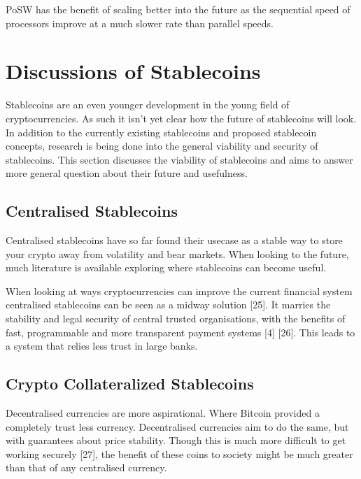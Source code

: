 \documentclass[english,]{IEEEtran}
\begin{document}
PoSW has the benefit of scaling better into the future as the sequential
speed of processors improve at a much slower rate than parallel speeds.

\section{Discussions of Stablecoins}\label{discussions-of-stablecoins}

Stablecoins are an even younger development in the young field of
cryptocurrencies. As such it isn't yet clear how the future of
stablecoins will look. In addition to the currently existing stablecoins
and proposed stablecoin concepts, research is being done into the
general viability and security of stablecoins. This section discusses
the viability of stablecoins and aims to answer more general question
about their future and usefulness.

\subsection{Centralised Stablecoins}\label{centralised-stablecoins}

Centralised stablecoins have so far found their usecase as a stable way
to store your crypto away from volatility and bear markets. When looking
to the future, much literature is available exploring where stablecoins
can become useful.

When looking at ways cryptocurrencies can improve the current financial
system centralised stablecoins can be seen as a midway solution
{[}25{]}. It marries the stability and legal security of central trusted
organisations, with the benefits of fast, programmable and more
transparent payment systems {[}4{]} {[}26{]}. This leads to a system
that relies less trust in large banks.

\subsection{Crypto Collateralized
Stablecoins}\label{crypto-collateralized-stablecoins-1}

Decentralised currencies are more aspirational. Where Bitcoin provided a
completely trust less currency. Decentralised currencies aim to do the
same, but with guarantees about price stability. Though this is much
more difficult to get working securely {[}27{]}, the benefit of these
coins to society might be much greater than that of any centralised
currency.
\end{document}
